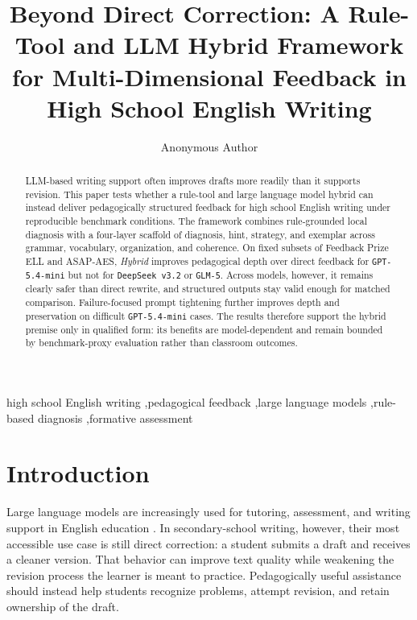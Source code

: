 \documentclass[preprint,12pt]{elsarticle}
\begin{document}
\begin{frontmatter}

\title{Beyond Direct Correction: A Rule-Tool and LLM Hybrid Framework for Multi-Dimensional Feedback in High School English Writing}

\author{Anonymous Author}
\address{Draft prepared in April 2026}

\begin{abstract}
LLM-based writing support often improves drafts more readily than it supports revision. This paper tests whether a rule-tool and large language model hybrid can instead deliver pedagogically structured feedback for high school English writing under reproducible benchmark conditions. The framework combines rule-grounded local diagnosis with a four-layer scaffold of diagnosis, hint, strategy, and exemplar across grammar, vocabulary, organization, and coherence. On fixed subsets of Feedback Prize ELL and ASAP-AES, \textit{Hybrid} improves pedagogical depth over direct feedback for \texttt{GPT-5.4-mini} but not for \texttt{DeepSeek v3.2} or \texttt{GLM-5}. Across models, however, it remains clearly safer than direct rewrite, and structured outputs stay valid enough for matched comparison. Failure-focused prompt tightening further improves depth and preservation on difficult \texttt{GPT-5.4-mini} cases. The results therefore support the hybrid premise only in qualified form: its benefits are model-dependent and remain bounded by benchmark-proxy evaluation rather than classroom outcomes.
\end{abstract}

\begin{keyword}
high school English writing \sep pedagogical feedback \sep large language models \sep rule-based diagnosis \sep formative assessment
\end{keyword}

\end{frontmatter}

\section{Introduction}

Large language models are increasingly used for tutoring, assessment, and writing support in English education \cite{ye2025position}. In secondary-school writing, however, their most accessible use case is still direct correction: a student submits a draft and receives a cleaner version. That behavior can improve text quality while weakening the revision process the learner is meant to practice. Pedagogically useful assistance should instead help students recognize problems, attempt revision, and retain ownership of the draft.
\end{document}
